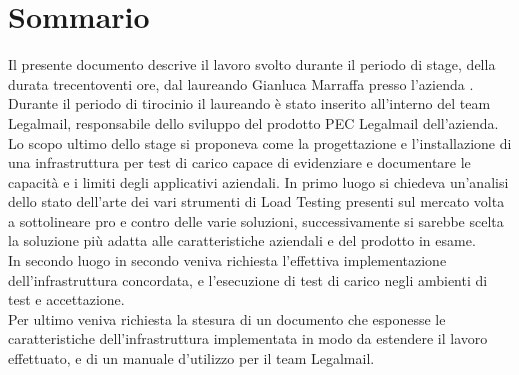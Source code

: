 
\cleardoublepage
{}
{}
\begingroup
\let\clearpage\relax
\let\cleardoublepage\relax
\let\cleardoublepage\relax

\chapter*{Sommario}

Il presente documento descrive il lavoro svolto durante il periodo di stage, della durata trecentoventi ore, dal laureando Gianluca Marraffa presso l'azienda \myCompany. \\
Durante il periodo di tirocinio il laureando è stato inserito all'interno del team Legalmail, responsabile dello sviluppo del prodotto PEC Legalmail dell'azienda.\\
Lo scopo ultimo dello stage si proponeva come la progettazione e l'installazione di una infrastruttura per test di carico capace di evidenziare e documentare le capacità e i limiti degli applicativi aziendali. In primo luogo si chiedeva un'analisi dello stato dell'arte dei vari strumenti di Load Testing presenti sul mercato volta a sottolineare pro e contro delle varie soluzioni, successivamente si sarebbe scelta la soluzione più adatta alle caratteristiche aziendali e del prodotto in esame. \\
In secondo luogo in secondo veniva richiesta l'effettiva implementazione dell'infrastruttura concordata, e l'esecuzione di test di carico negli ambienti di test e accettazione. \\
Per ultimo veniva richiesta la stesura di un documento che esponesse le caratteristiche dell'infrastruttura implementata in modo da estendere il lavoro effettuato, e di un manuale d'utilizzo per il team Legalmail.

%
%

\endgroup			

\vfill

